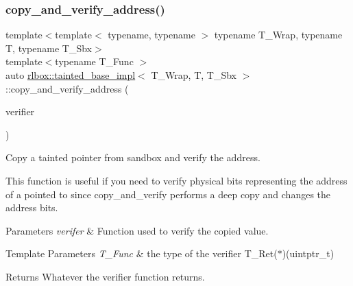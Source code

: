 \subsubsection{\texorpdfstring{copy\+\_\+and\+\_\+verify\+\_\+address()}{copy\_and\_verify\_address()}}
{\footnotesize\ttfamily template$<$template$<$ typename, typename $>$ typename T\+\_\+\+Wrap, typename T, typename T\+\_\+\+Sbx$>$ \\
template$<$typename T\+\_\+\+Func $>$ \\
auto \hyperlink{classrlbox_1_1tainted__base__impl}{rlbox\+::tainted\+\_\+base\+\_\+impl}$<$ T\+\_\+\+Wrap, T, T\+\_\+\+Sbx $>$\+::copy\+\_\+and\+\_\+verify\+\_\+address (\begin{DoxyParamCaption}\item[{T\+\_\+\+Func}]{verifier }\end{DoxyParamCaption})\hspace{0.3cm}{\ttfamily [inline]}}



Copy a tainted pointer from sandbox and verify the address. 

This function is useful if you need to verify physical bits representing the address of a pointed to since copy\+\_\+and\+\_\+verify performs a deep copy and changes the address bits.


\begin{DoxyParams}{Parameters}
{\em verifer} & Function used to verify the copied value. \\
\hline
\end{DoxyParams}

\begin{DoxyTemplParams}{Template Parameters}
{\em T\+\_\+\+Func} & the type of the verifier {\ttfamily T\+\_\+\+Ret($\ast$)(uintptr\+\_\+t)} \\
\hline
\end{DoxyTemplParams}
\begin{DoxyReturn}{Returns}
Whatever the verifier function returns. 
\end{DoxyReturn}
\mbox{\label{classrlbox_1_1tainted__base__impl_a76e49089d448ba0cfa7ef6d7c1e2d288}} 
